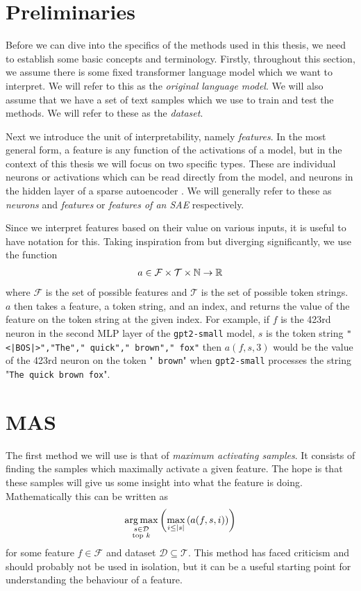 \documentclass[../main.tex]{subfiles}
\begin{document}
\section{Preliminaries}
Before we can dive into the specifics of the methods used in this thesis, 
we need to establish some basic concepts and terminology.
Firstly, throughout this section, we assume there is some fixed 
transformer language model \citep{vaswani_attention_2023} 
which we want to interpret.
We will refer to this as the \emph{original language model}.
We will also assume that we have a set of text samples 
which we use to train and test the methods.
We will refer to these as the \emph{dataset}.

Next we introduce the unit of interpretability, namely \emph{features}. 
In the most general form, a feature is any function of the activations 
of a model, but in the context of this thesis we will focus on two 
specific types.
These are individual neurons or activations which can be read directly 
from the model, and neurons in the hidden layer of 
a sparse autoencoder \citep{conmy_towards_2023}.
We will generally refer to these as \emph{neurons} and 
\emph{features} or \emph{features of an SAE} respectively.

Since we interpret features based on their value on various inputs, 
it is useful to have notation for this.
Taking inspiration from \citet{foote_neuron_2023} 
but diverging significantly, we use the function
\begin{align*}
    a\in\mathcal{F}\times\mathcal{T}\times\mathbb{N}\to\mathbb{R}
\end{align*} 
where $\mathcal{F}$ is the set of possible features and
$\mathcal{T}$ is the set of possible token strings.
$a$ then takes a feature, a token string, and an index, and returns 
the value of the feature on the token string at the given index.
For example, if $f$ is the 423rd neuron in the second MLP layer of 
the \verb|gpt2-small| model, $s$ is the token string 
\verb="<|BOS|>","The"," quick"," brown"," fox"=
then $a(f,s,3)$ would be the value of the 423rd neuron on the token 
"\verb| brown|" when \verb|gpt2-small| processes 
the string "\verb|The quick brown fox|".

\section{MAS}
The first method we will use is that of \emph{maximum activating samples}.
It consists of finding the samples which maximally activate a given feature.
The hope is that these samples will give us some insight 
into what the feature is doing.
Mathematically this can be written as
\begin{align*}
    \operatorname*{arg\,max}_{\substack{s\in\mathcal{D}\\ \text{top }k}}\left(\max_{i\leq|s|}\left(a(f,s,i)\right)\right)
\end{align*}
for some feature $f\in\mathcal{F}$ 
and dataset $\mathcal{D}\subseteq\mathcal{T}$.
This method has faced criticism \citep{bolukbasi_interpretability_2021} 
and should probably not be used in isolation, but it can be a useful
starting point for understanding the behaviour of a feature.
\end{document}
